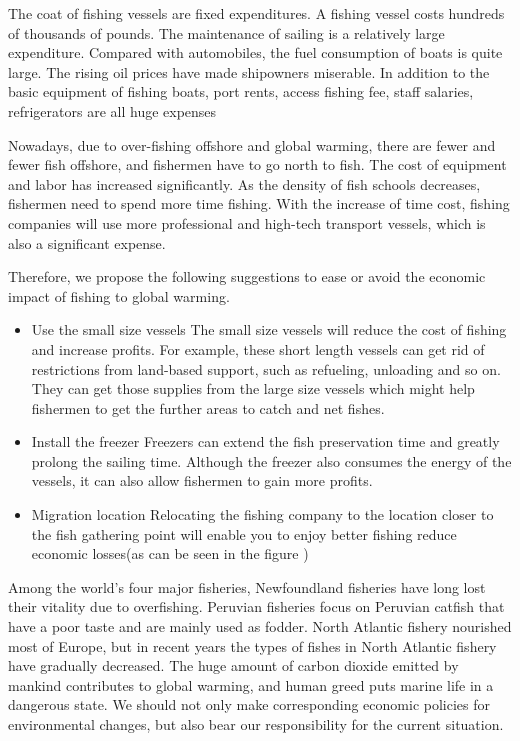 \documentclass{mcmthesis}
\begin{document}
The coat of fishing vessels are fixed expenditures. A fishing vessel costs hundreds of thousands of pounds. The maintenance of sailing is a relatively large expenditure. Compared with automobiles, the fuel consumption of boats is quite large. The rising oil prices have made shipowners miserable.
In addition to the basic equipment of fishing boats, port rents, access fishing fee, staff salaries, refrigerators are all huge expenses

Nowadays, due to over-fishing offshore and global warming, there are fewer and fewer fish  offshore, and fishermen have to go north to fish. The cost of equipment and labor has increased significantly. As the density of fish schools decreases, fishermen need to spend more time fishing. With the increase of time cost, fishing companies will use more professional and high-tech transport vessels, which is also a significant expense.


Therefore, we propose the following suggestions to ease or avoid the economic impact of fishing to global warming.

\begin{itemize}

\item 
Use the small size vessels
The small size vessels will reduce the cost of fishing and increase profits. For example, these short length vessels can get rid of restrictions from land-based support, such as refueling, unloading and so on. They can get those supplies from the large size vessels which might help fishermen to get the further areas to catch and net fishes.
\item
 Install the freezer
Freezers can extend the fish preservation time and greatly prolong the sailing time. Although the freezer also consumes the energy of the vessels, it can also allow fishermen to gain more profits.
\item 
Migration location
Relocating the fishing company to the location closer to the fish gathering point will  enable you to enjoy better fishing reduce economic losses(as can be seen in the figure ) 
\end{itemize}

Among the world's four major fisheries, Newfoundland fisheries have long lost their vitality due to overfishing. Peruvian fisheries focus on Peruvian catfish that have a poor taste and are mainly used as fodder. North Atlantic fishery nourished most of Europe, but in recent years the types of fishes in North Atlantic fishery have gradually decreased. 
The huge amount of carbon dioxide emitted by mankind contributes to global warming, and human greed puts marine life in a dangerous state. We should not only make corresponding economic policies for environmental changes, but also bear our responsibility for the current situation.
\end{document}
